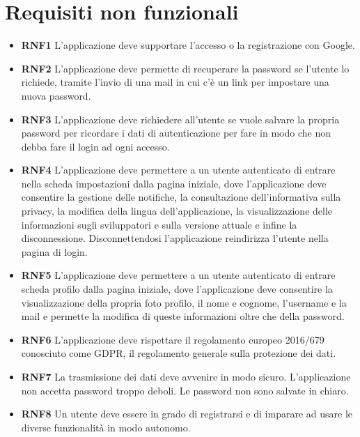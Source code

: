 \documentclass[a4paper,12pt]{article}
\begin{document}
\section*{Requisiti non funzionali}
\begin{itemize} \setlength\itemsep{0.01em}

\item \textbf {\hypertarget{RNF1}{RNF1}}  L'applicazione deve supportare l'accesso o la registrazione con Google.
\item \textbf {\hypertarget{RNF2}{RNF2}}  L'applicazione deve permette di recuperare la password se l'utente lo richiede, tramite l'invio di una mail in cui c'è un link per impostare una nuova password.
\item \textbf {\hypertarget{RNF3}{RNF3}}  L'applicazione deve richiedere all'utente se vuole salvare la propria password per ricordare i dati di autenticazione per fare in modo che non debba fare il login ad ogni accesso.
\item \textbf {\hypertarget{RNF4}{RNF4}}  L'applicazione deve permettere a un utente autenticato di entrare nella scheda impostazioni dalla pagina iniziale, dove l'applicazione deve consentire la gestione delle notifiche, la consultazione dell'informativa sulla privacy, la modifica della lingua dell'applicazione, la visualizzazione delle informazioni sugli sviluppatori e sulla versione attuale e infine la disconnessione. Disconnettendosi l'applicazione reindirizza l'utente nella pagina di login.
\item \textbf {\hypertarget{RNF5}{RNF5}}  L'applicazione deve permettere a un utente autenticato di entrare scheda profilo dalla pagina iniziale, dove l'applicazione deve consentire la visualizzazione della propria foto profilo, il nome e cognome, l'username e la mail e permette la modifica di queste informazioni oltre che della password.
\item \textbf {\hypertarget{RNF6}{RNF6} } L'applicazione deve rispettare il regolamento europeo 2016/679 conosciuto come GDPR, il regolamento generale sulla protezione dei dati.
\item \textbf {\hypertarget{RNF7}{RNF7}} 
La trasmissione dei dati deve avvenire in modo sicuro.
L'applicazione non accetta password troppo deboli.
Le password non sono salvate in chiaro.
\item \textbf {\hypertarget{RNF8}{RNF8}} Un utente deve essere in grado di registrarsi e di imparare ad usare le diverse funzionalità in modo autonomo.

\end{itemize}
\end{document}
